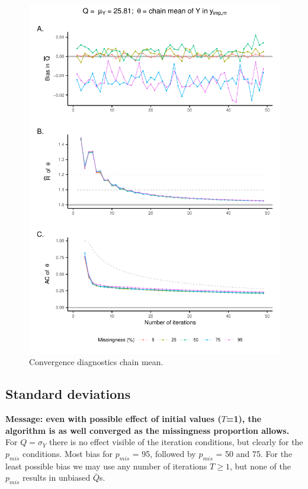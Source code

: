 \documentclass[Royal,times,sageh]{sagej}
\begin{document}
\begin{figure}

{\centering \includegraphics{manuscript_files/figure-latex/mean-1} 

}

\caption{Convergence diagnostics chain mean.}\label{fig:mean}
\end{figure}

\hypertarget{standard-deviations}{%
\subsection{Standard deviations}\label{standard-deviations}}

\textbf{Message: even with possible effect of initial values (\(T\)=1), the algorithm is as well converged as the missingness proportion allows.} For \(Q=\sigma_Y\) there is no effect visible of the iteration conditions, but clearly for the \(p_{mis}\) conditions. Most bias for \(p_{mis}\) = 95, followed by \(p_{mis}\) = 50 and 75. For the least possible bias we may use any number of iterations \(T\geq1\), but none of the \(p_{mis}\) results in unbiased \(\bar{Q}\)s.
\end{document}

